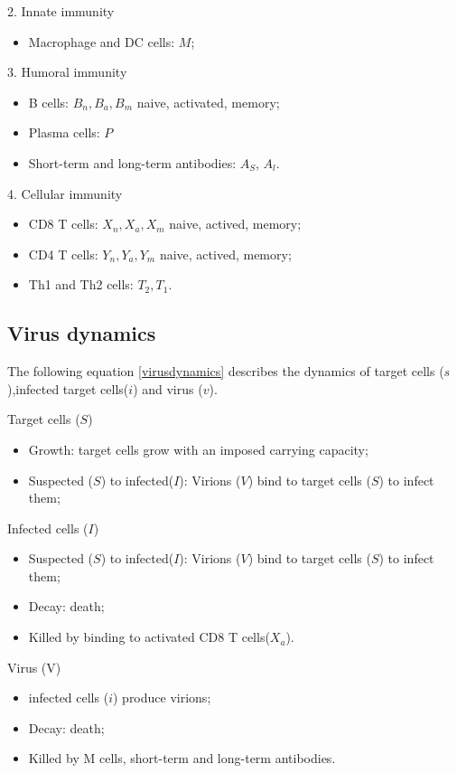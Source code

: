 \documentclass[preprint,11pt,sort&compress,square]{elsarticle}
\numberwithin{equation}{section}
\begin{document}
2. Innate immunity
\begin{itemize}
	\item Macrophage and DC cells:    $M$;
\end{itemize}

3. Humoral immunity
\begin{itemize}
	\item B cells: $B_{n},B_{a},B_{m}$ naive, activated, memory;
	\item Plasma cells: $P$
	\item Short-term and long-term antibodies: $A_{S}$, $A_{l}$.
\end{itemize}

4. Cellular immunity
\begin{itemize}
	\item CD8 T cells: $X_{n},X_{a},X_{m}$ naive, actived, memory;
	\item CD4 T cells: $Y_{n},Y_{a},Y_{m}$ naive, actived, memory;
	\item Th1 and Th2 cells: $T_{2},T_{1}$.
\end{itemize}

\subsection{Virus dynamics}
The following equation \eqref{virusdynamics} describes the dynamics of target cells ($s$),infected target cells($i$) and virus ($v$).


\noindent Target cells ($S$)
\begin{itemize}
	\item Growth: target cells grow with an imposed carrying capacity;
	\item Suspected ($S$) to infected($I$): Virions ($V$) bind to target cells ($S$) to infect them;
\end{itemize}

\noindent Infected cells ($I$)
\begin{itemize}
	\item Suspected ($S$) to infected($I$): Virions ($V$) bind to target cells ($S$) to infect them;
	\item Decay: death;
	\item Killed by binding to activated CD8 T cells($X_{a}$).
\end{itemize}

\noindent Virus (V)
\begin{itemize}
	\item infected cells ($i$) produce virions;
	\item Decay: death;
	\item Killed by M cells, short-term and long-term antibodies.
\end{itemize}
\end{document}
